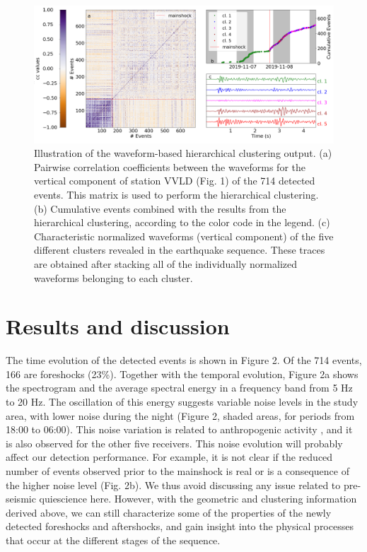\documentclass[a4paper,12pt,twoside]{article}
\begin{document}
\begin{figure}
    \centering
     \includegraphics[width=1\linewidth]{wigg_cc_mat_cluster.png}    \caption{Illustration of the waveform-based hierarchical clustering output. (a) Pairwise correlation coefficients between the waveforms for the vertical component of station VVLD (Fig. 1) of the 714 detected events. This matrix is used to perform the hierarchical clustering. (b) Cumulative events combined with the results from the hierarchical clustering, according to the color code in the legend. (c) Characteristic normalized waveforms (vertical component) of the five different clusters revealed in the earthquake sequence. These traces are obtained after stacking all of the individually normalized waveforms belonging to each cluster.}
\end{figure}    \label{fig:declustering}


\section*{Results and discussion}
\label{sec:results}

The time evolution of the detected events is shown in Figure 2. Of the 714 events, 166 are foreshocks (23\%). Together with the temporal evolution, Figure 2a shows the spectrogram and the average spectral energy in a frequency band from 5 Hz to 20 Hz. The oscillation of this energy suggests variable noise levels in the study area, with lower noise during the night (Figure 2, shaded areas, for periods from 18:00 to 06:00). This noise variation is related to anthropogenic activity \citep{Poli_2020}, and it is also observed for the other five receivers. This noise evolution will probably affect our detection performance. For example, it is not clear if the reduced number of events observed prior to the mainshock is real or is a consequence of the higher noise level (Fig. 2b). We thus avoid discussing any issue related to pre-seismic quiescience here. However, with the geometric and clustering information derived above, we can still characterize some of the properties of the newly detected foreshocks and aftershocks, and gain insight into the physical processes that occur at the different stages of the sequence.
\end{document}
